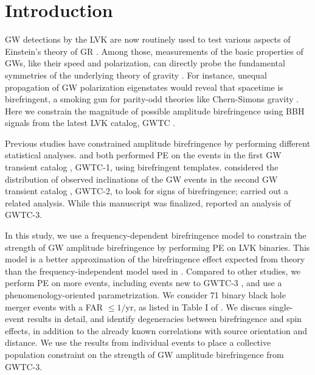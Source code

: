 \documentclass[aps,prd,twocolumn,superscriptaddress,preprintnumbers,nofootinbib]{revtex4-2}
\begin{document}
\section{Introduction}
\label{sec:Introduction}
\Ac{GW} detections by the \ac{LVK} \citep{LIGO, Virgo, KAGRA} are now routinely used to test various aspects of Einstein's theory of \ac{GR} \citep{LIGOScientific:2016lio,LIGOScientific:2018dkp,LIGOScientific:2021sio}.
Among those, measurements of the basic properties of \acp{GW}, like their speed and polarization, can directly probe the fundamental symmetries of the underlying theory of gravity \citep{Will:2018bme}.
For instance, unequal propagation of \ac{GW} polarization eigenstates would reveal that spacetime is birefringent, a smoking gun for parity-odd theories like Chern-Simons gravity \citep{Lue:1998mq,Jackiw:2003pm,Alexander:2009tp,Sopuerta:2009iy}.
Here we constrain the magnitude of possible amplitude birefringence using \ac{BBH} signals from the latest \ac{LVK} catalog, GWTC \citep{GWTC-3}.

Previous studies have constrained amplitude birefringence by performing different statistical analyses.
\citet{Yamada_2020} and \citet{Wang_2021} both performed \ac{PE} on the events in the first \ac{GW} transient catalog \citep{GWTC-1}, GWTC-1, using birefringent templates.
\citet{Okounkova_2022} considered the distribution of observed inclinations of the \ac{GW} events in the second \ac{GW} transient catalog \citep{GWTC-2}, GWTC-2, to look for signs of birefringence; \citet{Vitale:2022pmu} carried out a related analysis.
While this manuscript was finalized, \citet{Zhu:2023wci} reported an analysis of GWTC-3.

In this study, we use a frequency-dependent birefringence model to constrain the strength of \ac{GW} amplitude birefringence by performing \ac{PE} on \ac{LVK} binaries.
This model is a better approximation of the birefringence effect expected from theory than the frequency-independent model used in \citet{Okounkova_2022}.
Compared to other studies, we perform \ac{PE} on more events, including events new to GWTC-3 \citep{GWTC-3}, and use a phenomenology-oriented parametrization.
We consider 71 binary black hole merger events with a \ac{FAR} $\leq1/\mathrm{yr}$, as listed in Table I of \citet{GWTC-3_population}.
We discuss single-event results in detail, and identify degeneracies between birefringence and spin effects, in addition to the already known correlations with source orientation and distance.
We use the results from individual events to place a collective population constraint on the strength of \ac{GW} amplitude birefringence from GWTC-3.
\end{document}
